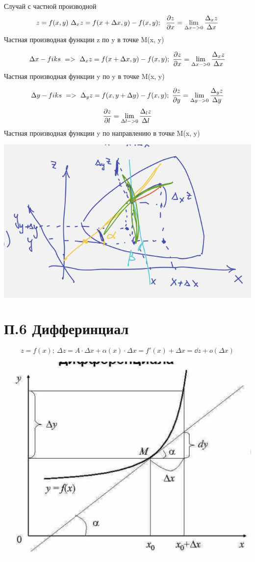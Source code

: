 \documentclass{article}
\begin{document}
Случай с частной производной 
\begin{equation*}
    z = f(x, y)\ \Delta_x z = f(x + \Delta x, y) - f(x, y); \ \ \pdv{z}{x} = \lim_{\Delta x-> 0}\frac{\Delta_x z}{\Delta x}
\end{equation*}
Частная производная функции z по y в точке M(x, y)

\begin{equation*}
    \Delta x - fiks\ => \ \Delta_x z = f(x +\Delta x, y) - f(x, y);\ \pdv{z}{x} = \lim_{\Delta x -> 0 }   \frac{\Delta_x z}{\Delta x}
\end{equation*}
Частная производная функции y по y в точке M(x, y)

\begin{equation*}
    \Delta y - fiks\ => \ \Delta_y z = f(x, y +\Delta y) - f(x, y);\ \pdv{z}{y} = \lim_{\Delta y -> 0 }   \frac{\Delta_y z}{\Delta y}
\end{equation*}
\begin{equation*}
    \pdv{z}{l} = \lim_{\Delta l -> 0 }   \frac{\Delta_l z}{\Delta l}
\end{equation*}
Частная производная функции y по направлению в точке M(x, y)
\begin{center}
    \includegraphics[width=.3\textwidth]{f(x,y).png} 
\end{center}

\section{П.6 Дифферинциал}


\begin{equation*}
    z = f(x);\ \Delta z =A \cdot \Delta x + \alpha(x)\cdot \Delta x = f'(x) + \Delta x = \dd z +o(\Delta x)
\end{equation*}
\begin{center}
    \includegraphics[width=.3\textwidth]{dx} 
\end{center}
\end{document}
